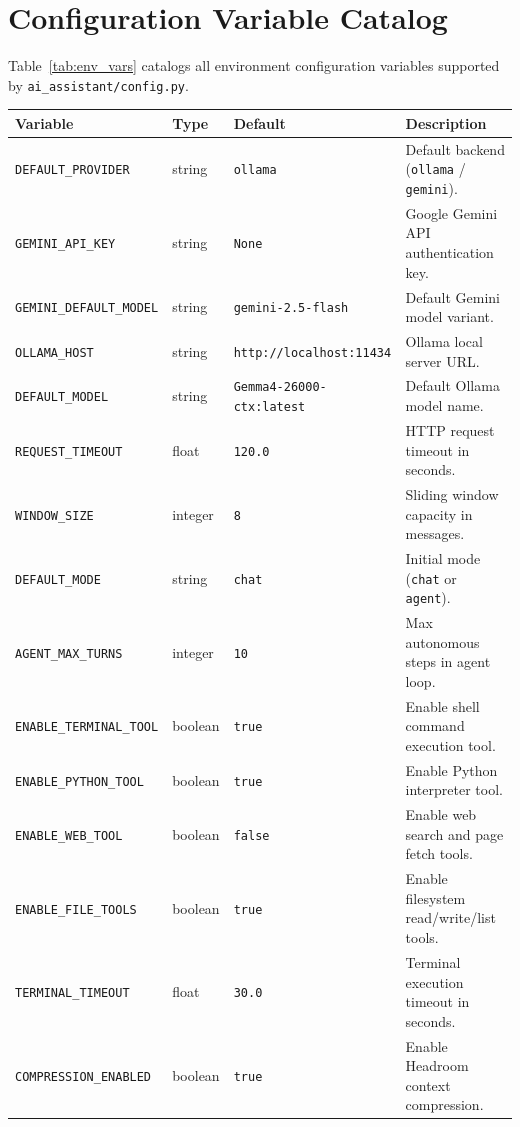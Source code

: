 \section{Configuration Variable Catalog}
Table~\ref{tab:env_vars} catalogs all environment configuration variables supported by \texttt{ai\_assistant/config.py}.

\begin{table}[htbp]
\centering
\small
\begin{tabular}{lllp{5.5cm}}
\toprule
\textbf{Variable} & \textbf{Type} & \textbf{Default} & \textbf{Description} \\
\midrule
\texttt{DEFAULT\_PROVIDER} & string & \texttt{ollama} & Default backend (\texttt{ollama} / \texttt{gemini}). \\
\texttt{GEMINI\_API\_KEY} & string & \texttt{None} & Google Gemini API authentication key. \\
\texttt{GEMINI\_DEFAULT\_MODEL} & string & \texttt{gemini-2.5-flash} & Default Gemini model variant. \\
\texttt{OLLAMA\_HOST} & string & \texttt{http://localhost:11434} & Ollama local server URL. \\
\texttt{DEFAULT\_MODEL} & string & \texttt{Gemma4-26000-ctx:latest} & Default Ollama model name. \\
\texttt{REQUEST\_TIMEOUT} & float & \texttt{120.0} & HTTP request timeout in seconds. \\
\texttt{WINDOW\_SIZE} & integer & \texttt{8} & Sliding window capacity in messages. \\
\texttt{DEFAULT\_MODE} & string & \texttt{chat} & Initial mode (\texttt{chat} or \texttt{agent}). \\
\texttt{AGENT\_MAX\_TURNS} & integer & \texttt{10} & Max autonomous steps in agent loop. \\
\texttt{ENABLE\_TERMINAL\_TOOL} & boolean & \texttt{true} & Enable shell command execution tool. \\
\texttt{ENABLE\_PYTHON\_TOOL} & boolean & \texttt{true} & Enable Python interpreter tool. \\
\texttt{ENABLE\_WEB\_TOOL} & boolean & \texttt{false} & Enable web search and page fetch tools. \\
\texttt{ENABLE\_FILE\_TOOLS} & boolean & \texttt{true} & Enable filesystem read/write/list tools. \\
\texttt{TERMINAL\_TIMEOUT} & float & \texttt{30.0} & Terminal execution timeout in seconds. \\
\texttt{COMPRESSION\_ENABLED} & boolean & \texttt{true} & Enable Headroom context compression. \\

\end{tabular}
\end{table}
